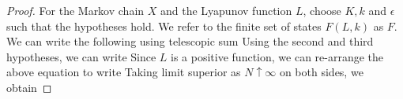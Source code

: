 \documentclass[a4paper,10pt,english]{article}
\begin{document}
\begin{proof}
For the Markov chain $X$ and the Lyapunov function $L$, choose $K,k$ and $\epsilon$ such that the hypotheses hold.  
We refer to the finite set of states $F(L,k)$ as $F$. 
We can write the following using telescopic sum
Using the second and third hypotheses, we can write 
Since $L$ is a positive function, we can re-arrange the above equation to write 
Taking limit superior as $N \uparrow \infty$ on both sides, we obtain

\end{proof}
\end{document}
